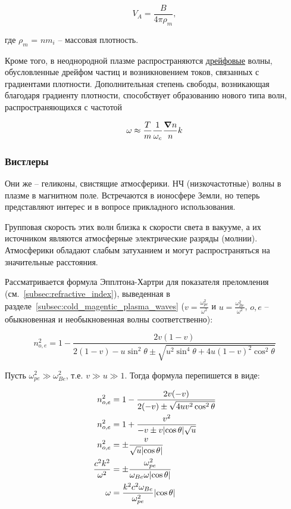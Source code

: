 \documentclass[10pt, a4paper]{article}
\begin{document}
\begin{equation*}
	V_A = \frac{B}{4\pi\rho_m},
\end{equation*}

где $\rho_m$ = $nm_i$ -- массовая плотность.

Кроме того, в неоднородной плазме распространяются \uline{дрейфовые} волны, обусловленные дрейфом частиц и возникновением токов, связанных с  градиентами плотности. Дополнительная степень свободы, возникающая  благодаря градиенту плотности, способствует образованию нового типа волн, распространяющихся с частотой~\cite{kroll} 

\begin{equation*}
	\omega\approx\frac{T}{m}\frac{1}{\omega_c}\frac{\grad{n}}{n}k
\end{equation*}

\subsubsection{Вистлеры}

Они же -- геликоны, свистящие атмосферики. НЧ (низкочастотные) волны в плазме в магнитном поле. Встречаются в ионосфере Земли, но теперь представляют интерес и в вопросе прикладного использования.

Групповая скорость этих волн близка к скорости света в вакууме, а их источником являются атмосферные электрические разряды (молнии). Атмосферики обладают слабым затуханием и могут распространяться на значительные расстояния. 

Рассматривается формула Эпплтона-Хартри для показателя преломления (см.~\ref{subsec:refractive_index}), выведенная в разделе~\ref{subsec:cold_magentic_plasma_waves} ($v=\frac{\omega_{pe}^2}{\omega^2}$ и $u=\frac{\omega_{Be}^2}{\omega^2}$, $o, e$ -- обыкновенная и необыкновенная волны соответственно):

\begin{equation*}
	n_{o,e}^2=1-\frac{2v(1-v)}{2(1-v)-u\sin^2\theta \pm \sqrt{u^2 \sin^4\theta+4u(1-v)^2 \cos^2\theta}}
\end{equation*}

Пусть $\omega_{pe}^2\gg\omega_{Be}^2$, т.е. $v\gg u \gg 1$. Тогда формула перепишется в виде:

\begin{align*}
	n_{o,e}^2&=1-\frac{2v(-v)}{2(-v)\pm\sqrt{4uv^2 \cos^2\theta}} \\
	n_{o,e}^2&=1+\frac{v^2}{-v\pm v\abs{\cos\theta}\sqrt{u}} \\
	n_{o,e}^2&=\pm \frac{v}{\sqrt{u}\abs{\cos\theta}} \\
	\frac{c^2k^2}{\omega^2} &= \pm\frac{\omega_{pe}^2}{\omega_{Be} \omega\abs{\cos\theta}} \\ 
	\omega &=\frac{k^2c^2\omega_{Be}}{\omega_{pe}^2}\abs{\cos\theta}
\end{align*}
\end{document}
